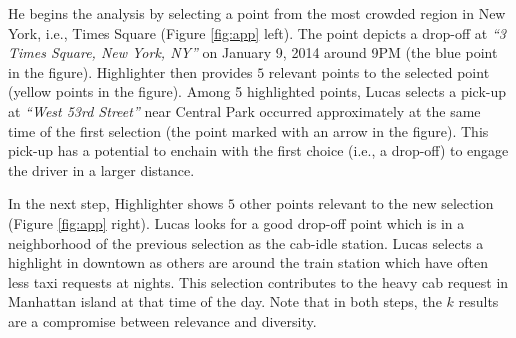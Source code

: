 
He begins the analysis by selecting a point from the most crowded region in New York, i.e., Times Square (Figure \ref{fig:app} left). The point depicts a drop-off at {\em ``3 Times Square, New York, NY''} on January 9, 2014 around 9PM (the blue point in the figure). {\sc Highlighter} then provides $5$ relevant points to the selected point (yellow points in the figure).
Among 5 highlighted points, Lucas selects a pick-up at {\em ``West 53rd Street''} near Central Park occurred approximately at the same time of the first selection (the point marked with an arrow in the figure). This pick-up has a potential to enchain with the first choice (i.e., a drop-off) to engage the driver in a larger distance.

In the next step, {\sc Highlighter} shows $5$ other points relevant to the new selection (Figure \ref{fig:app} right). Lucas looks for a good drop-off point which is in a neighborhood of the previous selection as the cab-idle station. Lucas selects a highlight in downtown as others are around the train station which have often less taxi requests at nights. This selection contributes to the heavy cab request in Manhattan island at that time of the day. Note that in both steps, the $k$ results are a compromise between relevance and diversity.

